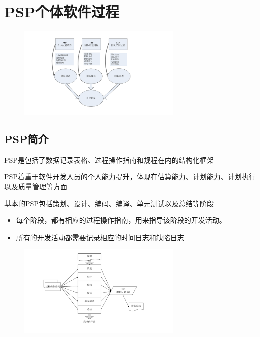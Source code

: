 \section{PSP个体软件过程}

\begin{figure}[H]
    \vspace{-0.5em}
	\centering
	\includegraphics[width=0.7\textwidth]{images/PSP.pdf}
    \vspace{-1em}
\end{figure}

\subsection{PSP简介}
PSP是包括了数据记录表格、过程操作指南和规程在内的结构化框架

PSP着重于软件开发人员的个人能力提升，体现在估算能力、计划能力、计划执行以及质量管理等方面

基本的PSP包括策划、设计、编码、编译、单元测试以及总结等阶段
\begin{itemize}
    \item 每个阶段，都有相应的过程操作指南，用来指导该阶段的开发活动。
    \item 所有的开发活动都需要记录相应的时间日志和缺陷日志
\end{itemize}

\begin{figure}[H]
    \vspace{-0.5em}
	\centering
	\includegraphics[width=0.7\textwidth]{images/PSP过程.pdf}
    \vspace{-1em}
\end{figure}

